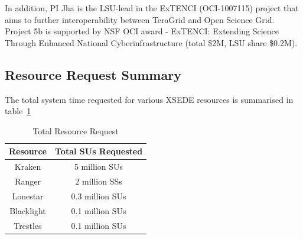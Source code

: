 \documentclass[a4paper,10pt]{article}
\newcommand{\up}{\vspace*{-1em}}
\begin{document}
In addition,  PI Jha is the LSU-lead in the ExTENCI (OCI-1007115) project that aims to further interoperability between TeraGrid and Open Science Grid.  Project 5b is supported by NSF OCI award - ExTENCI: Extending Science Through Enhanced National Cyberinfrastructure (total \$2M, LSU share \$0.2M). 

\subsection*{Resource Request Summary}

The total system time requested for various XSEDE resources is summarised in table~\ref{table:systems}
\begin{table}[!h]
\up
\begin{center}
\begin{tabular}{|c| c | }
\hline 
Resource & Total SUs Requested \\ 
\hline
Kraken   & 5 million SUs \\
\hline
Ranger   & 2 million SSs \\
\hline
Lonestar & 0.3 million SUs \\
\hline
Blacklight & 0.1 million SUs \\
\hline
Trestles & 0.1 million SUs \\
\hline
\end{tabular}
\end{center}
  \caption{Total Resource Request}\label{table:systems}
\up
\end{table}



\end{document}
